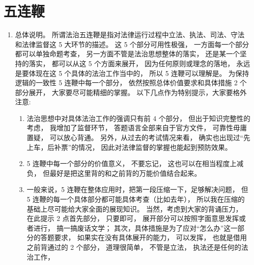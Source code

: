 \section{五连鞭}
\begin{enumerate}
  \item 总体说明。
        所谓法治五连鞭是指对法律运行过程中立法、执法、司法、守法和法律监督这 5 大环节的描述。
        这 5 个部分可用性极强，
        一方面每一个部分都可以单独命题考查，
        另一方面不管是法治思想整体的落实，
        还是某一个坚持的落实，
        都可以从这 5 个方面来展开，
        因为任何原则或理念的落地，
        永远是要体现在这 5 个具体的法治工作当中的，
        所以 5 连鞭可以理解是。
        为保持逻辑的一致性 5 连鞭中每一个部分，
        依然按照总体价值要求和具体措施 2 个部分展开，
        大家要尽可能精细的掌握。
        以下几点作为特别提示，大家要格外注意:
        \begin{enumerate}
          \item 法治思想中对具体法治工作的强调只有前 4 个部分，
                但出于知识完整性的考虑，
                我增加了监督环节，
                答题语言全部来自于官方文件，
                可靠性毋庸置疑，
                可以放心背通。
                另外，从过去的考试情况来看，
                确实也出现过“先上车，后补票”的情况，
                因此对法律监督的掌握也能起到预防效果。
          \item 5 连鞭中每一个部分的价值意义，
                不要忘记，
                这也可以在相当程度上减负，
                但最好是把这里背的和之前背的万能价值结合起来。
          \item 一般来说，5 连鞭在整体应用时，把第一段压缩一下，足够解决问题，
                但 5 连鞭的每一个具体部分都可能具体考查（比如去年），
                所以我在压缩的基础上尽可能给大家全面的展现知识。
                当然，考虑到大家的背诵压力，
                在此提示 2 点首先部分，
                只要即可，
                展开部分可以按照字面意思发挥或者进行，
                搞一搞废话文学；
                其次，具体措施是为了应对“怎么办”这一部分的答题要求，
                如果实在没有具体展开的能力，
                可以发挥，
                也就是借用之前背通过的 2 个部分，
                道理很简单，
                不管是立法，
                执法还是任何的法治工作，
\end{enumerate}
\end{enumerate}
